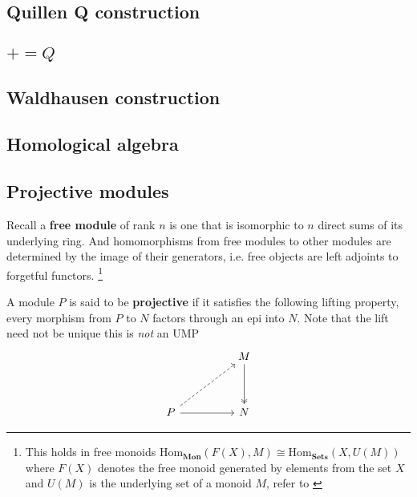 \documentclass[12pt]{article}
\numberwithin{equation}{section}
\begin{document}
	\subsection{Quillen Q construction}
	\subsection{$+=Q$}
	\subsection{Waldhausen construction}
	
	
	\begin{appendices}
	\section{Homological algebra}
	\subsection{Projective modules}
	Recall a\textbf{ free module} of rank $n$ is one that is isomorphic to $n$ direct sums of its underlying ring. And homomorphisms from free modules to other modules are determined by the image of their generators, i.e. free objects are left adjoints to forgetful functors. \footnote{This holds in free monoids $\mathrm{Hom}_\mathbf{Mon}(F(X), M) \cong \mathrm{Hom}_\mathbf{Sets} (X, U(M))$ where $F(X)$ denotes the free monoid generated by elements from the set $X$ and $U(M)$ is the underlying set of a monoid $M$, refer to \cite[p. ~208]{Awodey} }
	
	A module $P$ is said to be \textbf{projective} if it satisfies the following lifting property, every morphism from $P$ to $N$ factors through an epi into $N$. Note that the lift need not be unique this is \textit{not} an UMP
	\[\begin{tikzcd}
		&& M \\
		\\
		P && N
		\arrow[two heads, from=1-3, to=3-3]
		\arrow[from=3-1, to=3-3]
		\arrow[dashed, from=3-1, to=1-3]
	\end{tikzcd}\]
	


\end{appendices}
\end{document}
